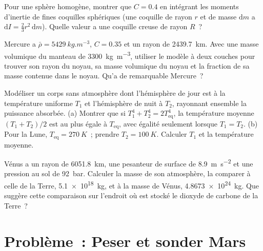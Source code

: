 \begin{exercise}[$\star\star$]\label{exo:b1:comparative-planetology:9}
Pour une sphère homogène, montrer que $C = 0.4$ en intégrant les moments
d'inertie de fines coquilles sphériques (une coquille de rayon $r$ et de masse
$\mathrm dm$ a $\mathrm dI = \tfrac23 r^2\,\mathrm dm$). Quelle valeur a une
coquille creuse de rayon $R$~?
\end{exercise}

\begin{exercise}[$\star\star\star$]\label{exo:b1:comparative-planetology:10}
Mercure a $\bar\rho = \qty{5429}{kg.m^{-3}}$, $C = 0.35$ et un rayon de
\qty{2439.7}{km}. Avec une masse volumique du manteau de \qty{3300}{kg.m^{-3}},
utiliser le modèle à deux couches pour trouver son rayon du noyau, sa masse
volumique du noyau et la fraction de sa masse contenue dans le noyau. Qu'a de
remarquable Mercure~?
\end{exercise}

\begin{exercise}[$\star\star\star$]\label{exo:b1:comparative-planetology:11}
Modéliser un corps sans atmosphère dont l'hémisphère de jour est à la
température uniforme $T_1$ et l'hémisphère de nuit à $T_2$, rayonnant ensemble
la puissance absorbée. (a) Montrer que si $T_1^4 + T_2^4 = 2T_\mathrm{eq}^4$, la
température moyenne $(T_1 + T_2)/2$ est au plus égale à $T_\mathrm{eq}$, avec
égalité seulement lorsque $T_1 = T_2$. (b) Pour la Lune,
$T_\mathrm{eq} = \qty{270}{K}$~; prendre $T_2 = \qty{100}{K}$. Calculer $T_1$ et
la température moyenne.
\end{exercise}

\begin{exercise}[$\star\star\star$]\label{exo:b1:comparative-planetology:12}
Vénus a un rayon de \qty{6051.8}{km}, une pesanteur de surface de
\qty{8.9}{m.s^{-2}} et une pression au sol de \qty{92}{bar}. Calculer la masse
de son atmosphère, la comparer à celle de la Terre, \qty{5.1e18}{kg}, et à la
masse de Vénus, \qty{4.8673e24}{kg}. Que suggère cette comparaison sur l'endroit
où est stocké le dioxyde de carbone de la Terre~?
\end{exercise}

\section{Problème~: Peser et sonder Mars}

